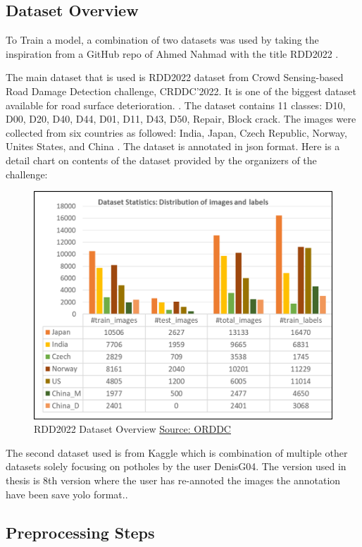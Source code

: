\subsection{Dataset Overview}
To Train a model, a combination of two datasets was used by taking the inspiration from a GitHub repo of Ahmed Nahmad with the title RDD2022 \cite{nahmad2000ModifiedRDD2022}.

The main dataset that is used is RDD2022 dataset from Crowd Sensing-based Road Damage Detection challenge, CRDDC’2022. It is one of the biggest dataset available for road surface deterioration. \cite{Arya2022}. The dataset contains 11 classes: D10, D00, D20, D40, D44, D01,  D11, D43, D50, Repair, Block crack. The images were collected from six countries as followed: India, Japan, Czech Republic, Norway, Unites States, and China \cite{Arya2022}. The dataset is annotated in json format. Here is a detail chart on contents of the dataset provided by the organizers of the challenge:

\begin{figure}[H] 
    \centering \includegraphics[width=0.8\linewidth]{figures/datasetogrdd2022.png} \caption{RDD2022 Dataset Overview \href{https://orddc2024.sekilab.global/data/}{Source: ORDDC}} \label{fig:rdd2022} 
\end{figure}


The second dataset used is from Kaggle which is combination of multiple other datasets solely focusing on potholes by the user DenisG04. The version used in thesis is 8th version where the user has re-annoted the images the annotation have been save yolo format.\cite{kaggle}.

\subsection{Preprocessing Steps}

